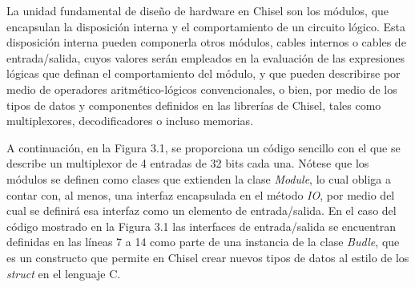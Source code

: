 La unidad fundamental de diseño de hardware en Chisel son los módulos, que encapsulan la disposición interna y el comportamiento de un circuito lógico. Esta disposición interna pueden componerla otros módulos, cables internos o cables de entrada/salida, cuyos valores serán empleados en la evaluación de las expresiones lógicas que definan el comportamiento del módulo, y que pueden describirse por medio de operadores aritmético-lógicos convencionales, o bien, por medio de los tipos de datos y componentes definidos en las librerías de Chisel, tales como multiplexores, decodificadores o incluso memorias.

A continuación, en la Figura 3.1, se proporciona un código sencillo con el que se describe un multiplexor de 4 entradas de 32 bits cada una. Nótese que los módulos se definen como clases que extienden la clase \textit{Module}, lo cual obliga a contar con, al menos, una interfaz encapsulada en el método \textit{IO}, por medio del cual se definirá esa interfaz como un elemento de entrada/salida. En el caso del código mostrado en la Figura 3.1 las interfaces de entrada/salida se encuentran definidas en las líneas 7 a 14 como parte de una instancia de la clase \textit{Budle}, que es un constructo que permite en Chisel crear nuevos tipos de datos al estilo de los \textit{struct} en el lenguaje C.

